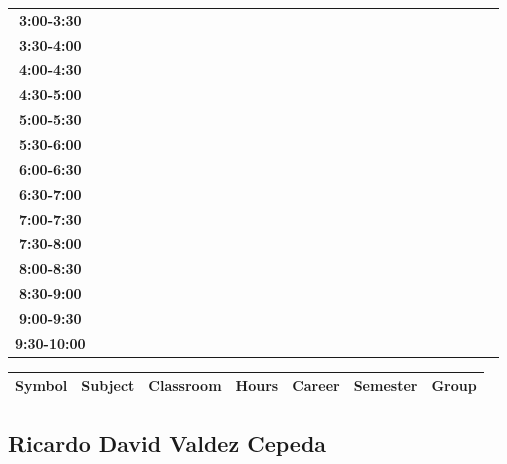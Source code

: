\documentclass{article}
\begin{document}
\begin{table}[ht]
\begin{tabular}{|c|c|c|c|c|c|c|c|c|c|c|c|c|c|c|c|c|c|c|c|c|c|c|c|c|c|c|c|c|c|}
\textbf{3:00-3:30} &   &   &   &   &   &   &   \\
 \cline{1-8} 
\textbf{3:30-4:00} &   &   &   &   &   &   &   \\
 \cline{1-8} 
\textbf{4:00-4:30} &   &   &   &   &   &   &   \\
 \cline{1-8} 
\textbf{4:30-5:00} &   &   &   &   &   &   &   \\
 \cline{1-8} 
\textbf{5:00-5:30} &   &   &   &   &   &   &   \\
 \cline{1-8} 
\textbf{5:30-6:00} &   &   &   &   &   &   &   \\
 \cline{1-8} 
\textbf{6:00-6:30} &   &   &   &   &   &   &   \\
 \cline{1-8} 
\textbf{6:30-7:00} &   &   &   &   &   &   &   \\
 \cline{1-8} 
\textbf{7:00-7:30} &   &   &   &   &   &   &   \\
 \cline{1-8} 
\textbf{7:30-8:00} &   &   &   &   &   &   &   \\
 \cline{1-8} 
\textbf{8:00-8:30} &   &   &   &   &   &   &   \\
 \cline{1-8} 
\textbf{8:30-9:00} &   &   &   &   &   &   &   \\
 \cline{1-8} 
\textbf{9:00-9:30} &   &   &   &   &   &   &   \\
 \cline{1-8} 
\textbf{9:30-10:00} &   &   &   &   &   &   &   \\
 \cline{1-8} 
\end{tabular}\end{table}

        
        \begin{tabular}{|>{\centering\arraybackslash}m{2cm}|>{\centering\arraybackslash}m{4cm}|>{\centering\arraybackslash}m{2cm}|>{\centering\arraybackslash}m{2cm}|>{\centering\arraybackslash}m{2cm}|>{\centering\arraybackslash}m{2cm}|>{\centering\arraybackslash}m{2cm}|}
        \hline
        \textbf{Symbol} & \textbf{Subject} & \textbf{Classroom} & \textbf{Hours} & \textbf{Career} & \textbf{Semester} & \textbf{Group} \\
        \hline
        \end{tabular}
                    

        \newpage
        

        \subsection{Ricardo David Valdez Cepeda}
        \vspace*{.1cm}
        
\end{document}
